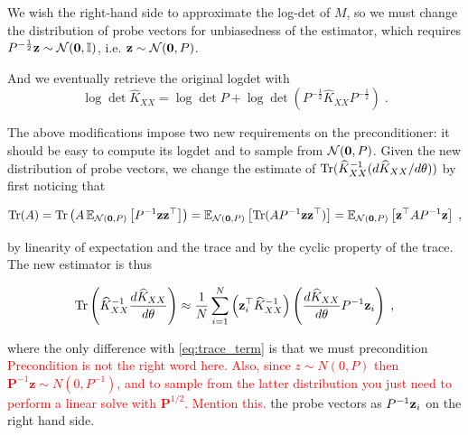 \documentclass{article}
\begin{document}
{We wish the right-hand side to approximate the log-det of $M$, so we must change the distribution of probe vectors for unbiasedness of the estimator, which requires $P^{-\frac 1 2} \vect z \sim \mathcal N(\vect 0, \Id)$, i.e. $\boldsymbol{\mathbf{z}} \sim \mathcal N(\boldsymbol{\mathbf{0}}, P)$.
%

%
And we eventually retrieve the original logdet with
\begin{equation} \label{eq:logdet_precond}
    \log\det \widehat K_{XX} = \log \det P + \log \det \left(P^{-\frac 1 2} \widehat K_{XX} P^{-\frac 1 2} \right) \; .
\end{equation}

The above modifications impose two new requirements on the preconditioner: it should be easy to compute its logdet and to sample from $\mathcal N(\boldsymbol{\mathbf{0}}, P)$. Given the new distribution of probe vectors, we change the estimate of $\operatorname{Tr}( \widehat K_{XX}^{-1} (d \widehat K_{XX} / d\theta))$ by first noticing that

\begin{equation*}
    \operatorname{Tr}(A) = \operatorname{Tr} \left( A \operatorname{\mathbb{E}}_{\mathcal N(\boldsymbol{\mathbf{0}}, P)} \left[ P^{-1} \boldsymbol{\mathbf{z}} \boldsymbol{\mathbf{z}}^\top \right] \right) 
    = \operatorname{\mathbb{E}}_{\mathcal N(\boldsymbol{\mathbf{0}}, P)} \left[ \operatorname{Tr}(A P^{-1} \boldsymbol{\mathbf{z}} \boldsymbol{\mathbf{z}}^\top ) \right]
    = \operatorname{\mathbb{E}}_{\mathcal N(\boldsymbol{\mathbf{0}}, P)} \left[ \boldsymbol{\mathbf{z}}^\top A P^{-1} \boldsymbol{\mathbf{z}} \right] \; ,
\end{equation*}

by linearity of expectation and the trace and by the cyclic property of the trace. The new estimator is thus

\begin{equation*}
    \operatorname{Tr} \left( \widehat K_{XX}^{-1} \frac{d \widehat K_{XX}}{d\theta} \right)
    \approx \frac 1 N \sum_{i=1}^N \left( \boldsymbol{\mathbf{z}}_i^\top \widehat K_{XX}^{-1} \right) \left( \frac{d \widehat K_{XX}}{d\theta} P^{-1} \boldsymbol{\mathbf{z}}_i \right) \; ,
\end{equation*}

where the only difference with \eqref{eq:trace_term} is that we must precondition \textcolor{red}{Precondition is not the right word here. Also, since $z \sim N(0,P)$ then $\bm{P}^{-1}\bm{z} \sim N(0,P^{-1})$, and to sample from the latter distribution you just need to perform a linear solve with $\bm{P}^{1/2}$. Mention this.} the probe vectors as $P^{-1} \boldsymbol{\mathbf{z}}_i$ on the right hand side. 


}
\end{document}
